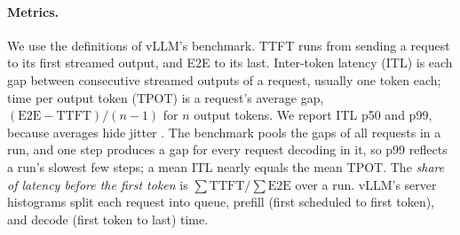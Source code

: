 \paragraph{Metrics.}
We use the definitions of vLLM's benchmark. TTFT runs from sending a request to its
first streamed output, and E2E to its last. Inter-token latency (ITL) is each gap
between consecutive streamed outputs of a request, usually one token each; time per
output token (TPOT) is a request's average gap, $(\mathrm{E2E}-\mathrm{TTFT})/(n-1)$
for $n$ output tokens. We report ITL p50 and p99, because averages hide jitter
\citep{agrawal2024etalon}. The benchmark pools the gaps of all requests in a run, and
one step produces a gap for every request decoding in it, so p99 reflects a run's
slowest few steps; a mean ITL nearly equals the mean TPOT. The \emph{share of latency
before the first token} is $\sum \mathrm{TTFT} / \sum \mathrm{E2E}$ over a run.
vLLM's server histograms split each request into queue, prefill (first scheduled to
first token), and decode (first token to last) time.
